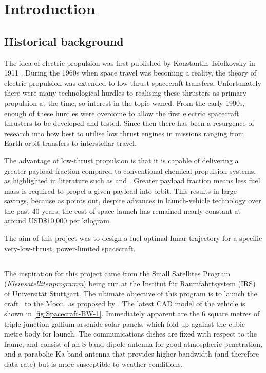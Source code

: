 \chapter{Introduction} \label{cha:Introduction}
 
\section{Historical background} \label{sec:Historical-background}

The idea of electric propulsion was first published by Konstantin Tsiolkovsky in 1911 \parencite{Choueiri2004}. During the 1960s when space travel was becoming a reality, the theory of electric propulsion was extended to low-thrust spacecraft transfers. Unfortunately there were many technological hurdles to realising these thrusters as primary propulsion at the time, so interest in the topic waned. From the early 1990s, enough of these hurdles were overcome to allow the first electric spacecraft thrusters to be developed and tested. Since then there has been a resurgence of research into how best to utilise low thrust engines in missions ranging from Earth orbit transfers to interstellar travel.
 
The advantage of low-thrust propulsion is that it is capable of delivering a greater payload fraction compared to conventional chemical propulsion systems, as highlighted in literature such as \textcite{Kluever1995} and \textcite{Yang2007}. Greater payload fraction means less fuel mass is required to propel a given payload into orbit. This results in large savings, because as \textcite{Manzella2008} points out, despite advances in launch-vehicle technology over the past 40 years, the cost of space launch has remained nearly constant at around USD\$10,000 per kilogram.
 
The aim of this project was to design a fuel-optimal lunar trajectory for a specific very-low-thrust, power-limited spacecraft.

\section{\BW} \label{sec:Spacecraft}

The inspiration for this project came from the Small Satellites Program (\emph{Kleinsatellitenprogramm}) being run at the Institut f\"{u}r Raumfahrtsystem (IRS) of Universit\"{a}t Stuttgart. The ultimate objective of this program is to launch the craft \BW\ to the Moon, as proposed by \textcite{Roeser2006}. The latest CAD model of the vehicle is shown in \autoref{fig:Spacecraft-BW-1}. Immediately apparent are the 6 square metres of triple junction gallium arsenide solar panels, which fold up against the cubic metre body for launch. The communications dishes are fixed with respect to the frame, and consist of an S-band dipole antenna for good atmospheric penetration, and a parabolic Ka-band antenna that provides higher bandwidth (and therefore data rate) but is more susceptible to weather conditions.

